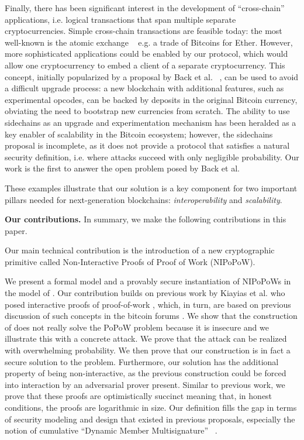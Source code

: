 Finally, there has been significant interest in the development of
``cross-chain'' applications, i.e. logical transactions that span multiple
separate cryptocurrencies. Simple cross-chain transactions are feasible today:
the most well-known is the atomic exchange ~\cite{tiernolan} e.g. a trade of
Bitcoins for Ether. However, more sophisticated applications could be enabled
by our protocol, which would allow one cryptocurrency to embed a client of a
separate cryptocurrency. This concept, initially popularized by a proposal by
Back et al. ~\cite{sidechains}, can be used to avoid a difficult
upgrade process: a new blockchain with additional features, such as
experimental opcodes, can be backed by deposits in the original Bitcoin
currency, obviating the need to bootstrap new currencies from scratch. The
ability to use sidechains as an upgrade and experimentation mechanism
has been heralded as a key enabler of scalability in the Bitcoin ecosystem;
however, the sidechains proposal is incomplete, as it does not provide a
protocol that satisfies a natural security definition, i.e. where attacks
succeed with only negligible probability. Our work is the first to answer the
open problem posed by Back et al.

These examples illustrate that our solution is a key component for two important
pillars needed for next-generation blockchains: \textit{interoperability} and
\textit{scalability}.

\textbf{Our contributions.}
In summary, we make the following contributions in this paper.

Our main technical contribution is the introduction of a new cryptographic
primitive called Non-Interactive Proofs of Proof of Work (NIPoPoW).

We present a formal model and a provably secure instantiation of NIPoPoWs in the
model of \cite{backbone}. Our contribution builds on previous work by Kiayias et
al. who posed interactive proofs of proof-of-work \cite{KLS}, which, in turn,
are based on previous discussion of such concepts in the bitcoin forums
\cite{highway}. We show that the construction of \cite{KLS} does not really
solve the PoPoW problem because it is insecure and we illustrate this with a
concrete attack. We prove that the attack can be realized with overwhelming
probability. We then prove that our construction is in fact a secure solution to
the problem. Furthermore, our solution has the additional property of being
non-interactive, as the previous construction could be forced into interaction
by an adversarial prover present. Similar to previous work, we prove that these
proofs are optimistically succinct meaning that, in honest conditions, the
proofs are logarithmic in size. Our definition fills the gap in terms of
security modeling and design that existed in previous proposals, especially the
notion of cumulative ``Dynamic Member Multisignature'' ~\cite{sidechains}.

